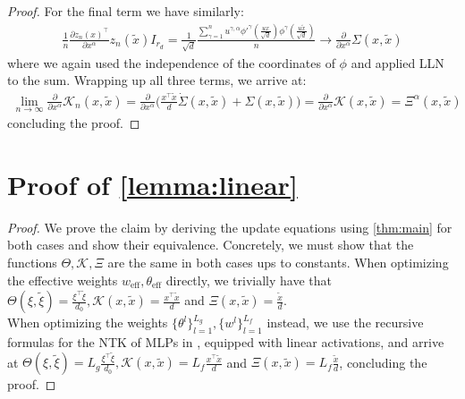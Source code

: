 \documentclass{article}
\theoremstyle{definition}
\theoremstyle{remark}
\renewcommand{\[}{\begin{eqnarray}}
\renewcommand{\]}{\end{eqnarray}}
\renewcommand{\[}{\begin{eqnarray}}
\renewcommand{\]}{\end{eqnarray}}
\begin{document}
\begin{proof}
For the final term we have similarly:
\begin{align}
    \frac{1}{n}\frac{\partial z_n(x)^\top}{\partial x^\alpha}z_n(\tilde{x})I_{r_d} = \frac{1}{\sqrt{d}}\frac{\sum_{\gamma =1}^n u^{\gamma,\alpha}\phi'^\gamma(\frac{ux}{\sqrt{d}})\phi^\gamma(\frac{u\tilde{x}}{\sqrt{d}})}{n} \to \frac{\partial}{\partial x^\alpha}\Sigma(x,\tilde{x})
\end{align}
where we again used the independence of the coordinates of $\phi$ and applied LLN to the sum. Wrapping up all three terms, we arrive at:
\begin{align}
    \lim_{n \to \infty}\frac{\partial}{\partial x^\alpha}\mathcal{K}_n(x,\tilde{x}) = \frac{\partial}{\partial x^\alpha}\Big(\frac{x^\top \tilde{x}}{d}\dot{\Sigma}(x,\tilde{x}) + \Sigma(x,\tilde{x})\Big) = \frac{\partial}{\partial x^\alpha}\mathcal{K}(x,\tilde{x}) = \Xi^\alpha(x,\tilde{x})
\end{align}
concluding the proof.
\end{proof}

\section{Proof of \cref{lemma:linear}}
\linear*
\begin{proof}
We prove the claim by deriving the update equations using \cref{thm:main} for both cases and show their equivalence.
Concretely, we must show that the functions $\Theta,\mathcal{K},\Xi$ are the same in both cases ups to constants. When optimizing the effective weights $w_{\text{eff}},\theta_{\text{eff}}$ directly, we trivially have that $\Theta(\xi,\tilde{\xi}) = \frac{\xi^\top \tilde{\xi}}{d_0}, \mathcal{K}(x,\tilde{x}) = \frac{x^\top \tilde{x}}{d}$ and $\Xi(x,\tilde{x}) = \frac{\tilde{x}}{d}$.\\
When optimizing the weights $\{\theta^l\}_{l=1}^{L_g},\{w^l\}_{l=1}^{L_f}$ instead, we use the recursive formulas for the NTK of MLPs in \cite{exact}, equipped with linear activations, and arrive at $\Theta(\xi,\tilde{\xi}) = L_g\frac{\xi^\top \tilde{\xi}}{d_0}, \mathcal{K}(x,\tilde{x}) = L_f\frac{x^\top \tilde{x}}{d}$ and $\Xi(x,\tilde{x}) = L_f\frac{\tilde{x}}{d}$, concluding the proof.
\end{proof}




\end{document}
